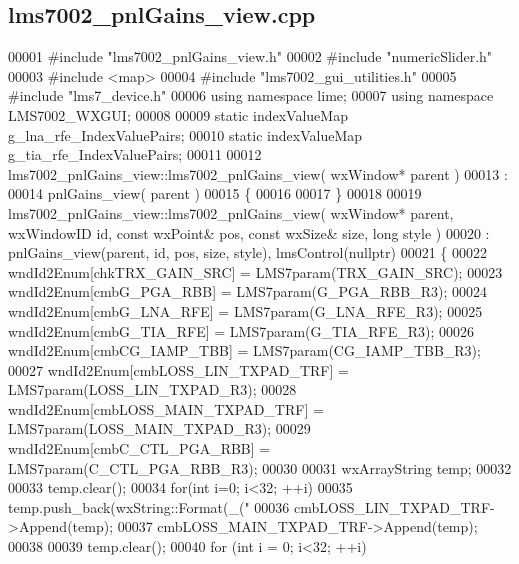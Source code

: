 \subsection{lms7002\+\_\+pnl\+Gains\+\_\+view.\+cpp}
\label{lms7002__pnlGains__view_8cpp_source}

\begin{DoxyCode}
00001 \textcolor{preprocessor}{#include "lms7002_pnlGains_view.h"}
00002 \textcolor{preprocessor}{#include "numericSlider.h"}
00003 \textcolor{preprocessor}{#include <map>}
00004 \textcolor{preprocessor}{#include "lms7002_gui_utilities.h"}
00005 \textcolor{preprocessor}{#include "lms7_device.h"}
00006 \textcolor{keyword}{using namespace }lime;
00007 \textcolor{keyword}{using namespace }LMS7002_WXGUI;
00008 
00009 \textcolor{keyword}{static} indexValueMap g_lna_rfe_IndexValuePairs;
00010 \textcolor{keyword}{static} indexValueMap g_tia_rfe_IndexValuePairs;
00011 
00012 lms7002_pnlGains_view::lms7002_pnlGains_view( wxWindow* parent )
00013 :
00014 pnlGains_view( parent )
00015 \{
00016 
00017 \}
00018 
00019 lms7002_pnlGains_view::lms7002_pnlGains_view( wxWindow* parent, wxWindowID \textcolor{keywordtype}{id}, \textcolor{keyword}{const} wxPoint& pos, \textcolor{keyword}{const} 
      wxSize& size, \textcolor{keywordtype}{long} style )
00020     : pnlGains_view(parent, id, pos, size, style), lmsControl(nullptr)
00021 \{
00022     wndId2Enum[chkTRX_GAIN_SRC] = LMS7param(TRX_GAIN_SRC);
00023     wndId2Enum[cmbG_PGA_RBB] = LMS7param(G_PGA_RBB_R3);
00024     wndId2Enum[cmbG_LNA_RFE] = LMS7param(G_LNA_RFE_R3);
00025     wndId2Enum[cmbG_TIA_RFE] = LMS7param(G_TIA_RFE_R3);
00026     wndId2Enum[cmbCG_IAMP_TBB] = LMS7param(CG_IAMP_TBB_R3);
00027     wndId2Enum[cmbLOSS_LIN_TXPAD_TRF] = LMS7param(LOSS\_LIN\_TXPAD\_R3);
00028     wndId2Enum[cmbLOSS_MAIN_TXPAD_TRF] = LMS7param(LOSS\_MAIN\_TXPAD\_R3);
00029     wndId2Enum[cmbC_CTL_PGA_RBB] = LMS7param(C\_CTL\_PGA\_RBB\_R3);
00030 
00031     wxArrayString temp;
00032 
00033     temp.clear();
00034     \textcolor{keywordflow}{for}(\textcolor{keywordtype}{int} i=0; i<32; ++i)
00035         temp.push\_back(wxString::Format(\_(\textcolor{stringliteral}{"%
00036     cmbLOSS_LIN_TXPAD_TRF->Append(temp);
00037     cmbLOSS_MAIN_TXPAD_TRF->Append(temp);
00038 
00039     temp.clear();
00040     \textcolor{keywordflow}{for} (\textcolor{keywordtype}{int} i = 0; i<32; ++i)
}
\end{DoxyCode}

